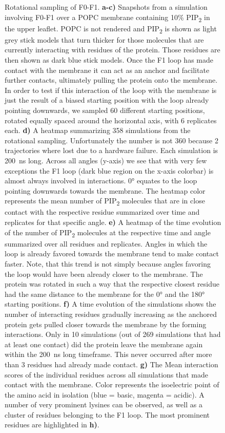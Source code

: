 \documentclass[
  letterpaper,
  DIV=11,
  numbers=noendperiod]{scrartcl}
\begin{document}
\begin{figure}
\begin{minipage}[t]{\linewidth}
{{}

}

\end{minipage}%

\caption{\label{fig-loop-importance}Rotational sampling of F0-F1.
\textbf{a-c)} Snapshots from a simulation involving F0-F1 over a POPC
membrane containing 10\% PIP\textsubscript{2} in the upper leaflet. POPC
is not rendered and PIP\textsubscript{2} is shown as light grey stick
models that turn thicker for those molecules that are currently
interacting with residues of the protein. Those residues are then shown
as dark blue stick models. Once the F1 loop has made contact with the
membrane it can act as an anchor and facilitate further contacts,
ultimately pulling the protein onto the membrane. In order to test if
this interaction of the loop with the membrane is just the result of a
biased starting position with the loop already pointing downwards, we
sampled 60 different starting positions, rotated equally spaced around
the horizontal axis, with 6 replicates each. \textbf{d)} A heatmap
summarizing 358 simulations from the rotational sampling. Unfortunately
the number is not 360 because 2 trajectories where lost due to a
hardware failure. Each simulation is 200~ns long. Across all angles
(y-axis) we see that with very few exceptions the F1 loop (dark blue
region on the x-axis colorbar) is almost always involved in
interactions. 0° equates to the loop pointing downwards towards the
membrane. The heatmap color represents the mean number of
PIP\textsubscript{2} molecules that are in close contact with the
respective residue summarized over time and replicates for that specific
angle. \textbf{e)} A heatmap of the time evolution of the number of
PIP\textsubscript{2} molecules at the respective time and angle
summarized over all residues and replicates. Angles in which the loop is
already favored towards the membrane tend to make contact faster. Note,
that this trend is not simply because angles favoring the loop would
have been already closer to the membrane. The protein was rotated in
such a way that the respective closest residue had the same distance to
the membrane for the 0° and the 180° starting positions. \textbf{f)} A
time evolution of the simulations shows the number of interacting
residues gradually increasing as the anchored protein gets pulled closer
towards the membrane by the forming interactions. Only in 10 simulations
(out of 269 simulations that had at least one contact) did the protein
leave the membrane again within the 200~ns long timeframe. This never
occurred after more than 3 residues had already made contact.
\textbf{g)} The Mean interaction scores of the individual residues
across all simulations that made contact with the membrane. Color
represents the isoelectric point of the amino acid in isolation (blue =
basic, magenta = acidic). A number of very prominent lysines can be
observed, as well as a cluster of residues belonging to the F1 loop. The
most prominent residues are highlighted in \textbf{h)}.}

\end{figure}
\end{document}
